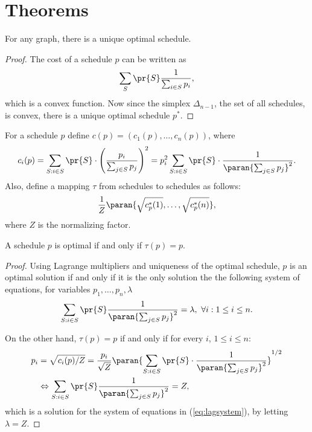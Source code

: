 \section{Theorems}
\begin{theorem}
 For any graph, there is a unique optimal schedule.
\end{theorem}
\begin{proof}
 The cost of a schedule $p$ can be written as 
 $$\sum_{S}\pr{S}\frac{1}{\sum_{i\in S} p_i},$$
 which is a convex function. Now since the simplex $\Delta_{n-1}$, the set of all schedules, is convex, there is a unique optimal schedule $p^*$.
\end{proof}




For a schedule $p$ define $c(p) = (c_1(p), \ldots, c_n(p))$, where 
$$c_i(p) = \sum_{S:i\in S} \pr{S} \cdot \left(\frac{p_i}{\sum_{j\in S} p_j}\right)^2 = 
p_i^2 \sum_{S:i\in S} \pr{S} \cdot \frac{1}{\paran{\sum_{j\in S} p_j}^2}.
$$
Also, define a mapping $\tau$ from schedules to schedules as follows:
$$\frac{1}{Z}\paran{\sqrt{c_p^*(1)}, \ldots, \sqrt{c_p^*(n)}},$$
where $Z$ is the normalizing factor.

\begin{theorem}
 A schedule $p$ is optimal if and only if $\tau(p) = p$.
\end{theorem}
\begin{proof}
 Using Lagrange multipliers and uniqueness of the optimal schedule, $p$ is an optimal solution if and only if it is the only solution the the following system of equations, for variables $p_1, \ldots, p_n, \lambda$
 \begin{align}\label{eq:lagsystem}
 \sum_{S:i\in S} \pr{S}\frac{1}{\paran{\sum_{j\in S}p_j}^2} = \lambda, \ \forall i: 1\leq i \leq n.
 \end{align}
 
 
 On the other hand, $\tau(p) = p$ if and only if for every $i$, $1\leq i \leq n$:
 \begin{align}
  p_i &= \sqrt{c_i(p)/Z} = \frac{p_i}{\sqrt{Z}} \paran{\sum_{S:i\in S} \pr{S} \cdot \frac{1}{\paran{\sum_{j\in S} p_j}^2}}^{1/2} \\
  & \Leftrightarrow \sum_{S:i\in S} \pr{S}\frac{1}{\paran{\sum_{j\in S}p_j}^2} = Z,
 \end{align}
 which is a solution for the system of equations in (\ref{eq:lagsystem}), by letting $\lambda = Z$.
\end{proof}

